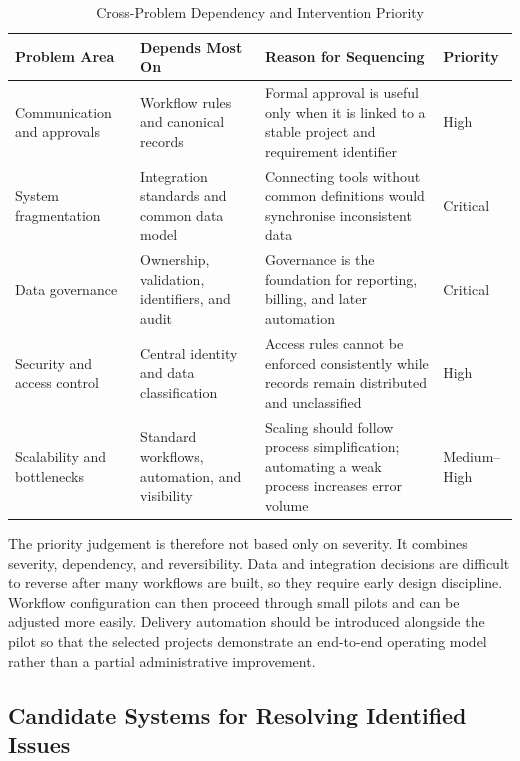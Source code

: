 \documentclass[12pt,a4paper]{report}
\begin{document}
\begin{table}[H]
\centering
\caption{Cross-Problem Dependency and Intervention Priority}
\label{tab:dependency-priority}
\small
\renewcommand{\arraystretch}{1.20}
\begin{tabularx}{\textwidth}{>{\raggedright\arraybackslash}p{2.7cm}
                                >{\raggedright\arraybackslash}p{3.0cm}
                                >{\raggedright\arraybackslash}X
                                >{\centering\arraybackslash}p{1.8cm}}
\toprule
\textbf{Problem Area} & \textbf{Depends Most On} & \textbf{Reason for Sequencing} & \textbf{Priority} \\
\midrule
Communication and approvals & Workflow rules and canonical records & Formal approval is useful only when it is linked to a stable project and requirement identifier & High \\
System fragmentation & Integration standards and common data model & Connecting tools without common definitions would synchronise inconsistent data & Critical \\
Data governance & Ownership, validation, identifiers, and audit & Governance is the foundation for reporting, billing, and later automation & Critical \\
Security and access control & Central identity and data classification & Access rules cannot be enforced consistently while records remain distributed and unclassified & High \\
Scalability and bottlenecks & Standard workflows, automation, and visibility & Scaling should follow process simplification; automating a weak process increases error volume & Medium--High \\
\bottomrule
\end{tabularx}
\end{table}

The priority judgement is therefore not based only on severity. It combines severity, dependency,
and reversibility. Data and integration decisions are difficult to reverse after many workflows are
built, so they require early design discipline. Workflow configuration can then proceed through
small pilots and can be adjusted more easily. Delivery automation should be introduced alongside
the pilot so that the selected projects demonstrate an end-to-end operating model rather than a
partial administrative improvement.


\subsection{Candidate Systems for Resolving Identified Issues}
\label{subsec:candidate-systems}
\end{document}
